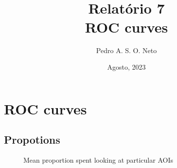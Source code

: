 \documentclass{article}
\title{Relatório 7 \\ ROC curves}
\author{Pedro A. S. O. Neto}
\date{Agosto, 2023}
\begin{document}
\maketitle

\section{ROC curves}

\subsection{Propotions}

\begin{figure}[H]
  \caption{Mean proportion spent looking at particular AOIs}
  \noindent{}
  \centering
\end{figure}
\end{document}
